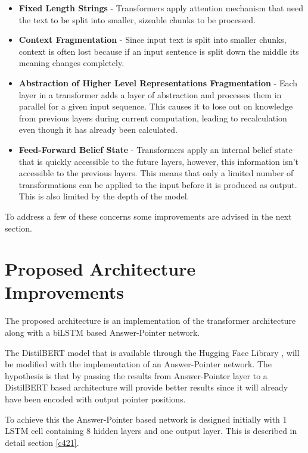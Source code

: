 \documentclass[a4paper,12pt]{report}
\begin{document}
       \begin{itemize}
        \item \textbf{Fixed Length Strings} - Transformers apply attention mechanism that need the text to be split into smaller, sizeable chunks to be processed.
        \item \textbf{Context Fragmentation} - Since input text is split into smaller chunks, context is often lost because if an input sentence is split down the middle its meaning changes completely.
        \item \textbf{Abstraction of Higher Level Representations Fragmentation} - Each layer in a transformer adds a layer of abstraction and processes them in parallel for a given input sequence. This causes it to lose out on knowledge from previous layers during current computation, leading to recalculation even though it has already been calculated.
        \item \textbf{Feed-Forward Belief State} - Transformers apply an internal belief state that is quickly accessible to the future layers, however, this information isn't accessible to the previous layers. This means that only a limited number of transformations can be applied to the input before it is produced as output. This is also limited by the depth of the model. \citep{fan2020addressing}
       \end{itemize}

       To address a few of these concerns some improvements are advised in the next section.

       \section{Proposed Architecture Improvements}\label{c42}

            The proposed architecture is an implementation of the transformer architecture along with a biLSTM based Answer-Pointer network.

            The DistilBERT model that is available through the Hugging Face Library \citep{hfTransformers}, will be modified with the implementation of an Answer-Pointer network. The hypothesis is that by passing the results from Answer-Pointer layer to a DistilBERT based architecture will provide better results since it will already have been encoded with output pointer positions.

            To achieve this the Answer-Pointer based network is designed initially with 1 LSTM cell containing 8 hidden layers and one output layer. This is described in detail section \ref{c421}.
\end{document}

